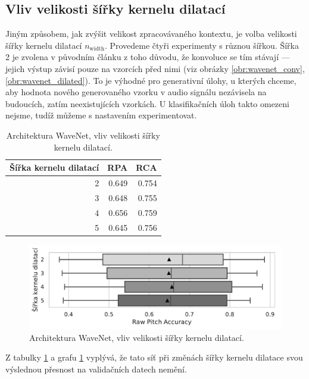 \subsection{Vliv velikosti šířky kernelu dilatací}

Jiným způsobem, jak zvýšit velikost zpracovávaného kontextu, je volba velikosti šířky kernelu dilatací $n_{\mathrm{width}}$. Provedeme čtyři experimenty s různou šířkou. Šířka 2 je zvolena v původním článku z toho důvodu, že konvoluce se tím stávají  --- jejich výstup závisí pouze na vzorcích před nimi (viz obrázky \ref{obr:wavenet_conv}, \ref{obr:wavenet_dilated}). To je výhodné pro generativní úlohy, u kterých chceme, aby hodnota nového generovaného vzorku v audio signálu nezávisela na budoucích, zatím neexistujících vzorkách. U klasifikačních úloh takto omezeni nejsme, tudíž můžeme s nastavením experimentovat. 

\begin{table}[h!]
\centering
    \begin{tabular}{rrr}
    \toprule
    Šířka kernelu dilatací &   RPA &   RCA \\
    \midrule
                        2 & 0.649 & 0.754 \\
                        3 & 0.648 & 0.755 \\
                        4 & 0.656 & 0.759 \\
                        5 & 0.645 & 0.756 \\
    \bottomrule
    \end{tabular}
\caption{Architektura WaveNet, vliv velikosti šířky kernelu dilatací.}\label{tab:wavenet_dilation_width}
\end{table}

\begin{figure}[h]\centering
    \includegraphics[scale=0.6]{../img/figures/wavenet_dilation_width_grey}
\caption{Architektura WaveNet, vliv velikosti šířky kernelu dilatací.}\label{obr:wavenet_dilation_width}
\end{figure}

Z tabulky \ref{tab:wavenet_dilation_width} a grafu \ref{obr:wavenet_dilation_width} vyplývá, že tato síť při změnách šířky kernelu dilatace svou výslednou přesnost na validačních datech nemění.

